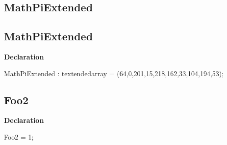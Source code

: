 \documentclass{report}
\newif\ifpdf
\begin{document}
\subsection*{\large{\textbf{MathPiExtended}}\normalsize\hspace{1ex}\hrulefill}
\else
\subsection*{MathPiExtended}
\fi
\label{ok_if_directive-MathPiExtended}
\begin{list}{}{
\setlength{\itemindent}{0cm}
\setlength{\listparindent}{0cm}
\setlength{\leftmargin}{\evensidemargin}
\addtolength{\leftmargin}{\tmplength}
\settowidth{\labelsep}{X}
\addtolength{\leftmargin}{\labelsep}
\setlength{\labelwidth}{\tmplength}
}
\item[\textbf{Declaration}\hfill]
\ifpdf
\begin{flushleft}
\fi
\begin{ttfamily}
MathPiExtended : textendedarray = (64,0,201,15,218,162,33,104,194,53);\end{ttfamily}

\ifpdf
\end{flushleft}
\fi

\end{list}
\ifpdf
\subsection*{\large{\textbf{Foo2}}\normalsize\hspace{1ex}\hrulefill}
\else
\subsection*{Foo2}
\fi
\label{ok_if_directive-Foo2}
\begin{list}{}{
\setlength{\itemindent}{0cm}
\setlength{\listparindent}{0cm}
\setlength{\leftmargin}{\evensidemargin}
\addtolength{\leftmargin}{\tmplength}
\settowidth{\labelsep}{X}
\addtolength{\leftmargin}{\labelsep}
\setlength{\labelwidth}{\tmplength}
}
\item[\textbf{Declaration}\hfill]
\ifpdf
\begin{flushleft}
\fi
\begin{ttfamily}
Foo2 = 1;\end{ttfamily}

\ifpdf
\end{flushleft}
\fi

\end{list}
\ifpdf
\end{document}
